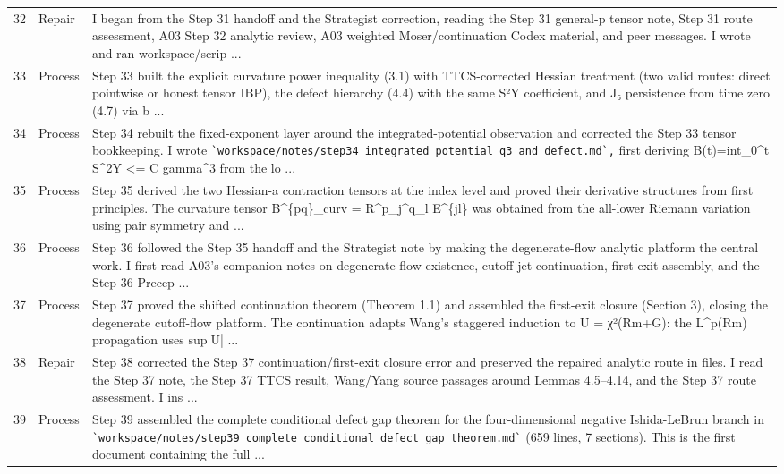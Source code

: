 \documentclass[UTF8,fontset=fandol,zihao=-4]{ctexart}
\begin{document}
\begin{longtable}{r p{} >{\raggedright\arraybackslash}p{}}
32 & Repair & I began from the Step 31 handoff and the Strategist correction, reading the Step 31 general-p tensor note, Step 31 route assessment, A03 Step 32 analytic review, A03 weighted Moser/continuation Codex material, and peer messages. I wrote and ran workspace/scrip ...\\
33 & Process & Step 33 built the explicit curvature power inequality (3.1) with TTCS-corrected Hessian treatment (two valid routes: direct pointwise or honest tensor IBP), the defect hierarchy (4.4) with the same S²Y coefficient, and J₆ persistence from time zero (4.7) via b ...\\
34 & Process & Step 34 rebuilt the fixed-exponent layer around the integrated-potential observation and corrected the Step 33 tensor bookkeeping. I wrote \nolinkurl{`workspace/notes/step34_integrated_potential_q3_and_defect.md`,} first deriving B(t)=int\_0\textasciicircum{}t S\textasciicircum{}2Y <= C gamma\textasciicircum{}3 from the lo ...\\
35 & Process & Step 35 derived the two Hessian-a contraction tensors at the index level and proved their derivative structures from first principles. The curvature tensor B\textasciicircum{}\{pq\}\_curv = R\textasciicircum{}p\_j\textasciicircum{}q\_l E\textasciicircum{}\{jl\} was obtained from the all-lower Riemann variation using pair symmetry and ...\\
36 & Process & Step 36 followed the Step 35 handoff and the Strategist note by making the degenerate-flow analytic platform the central work. I first read A03's companion notes on degenerate-flow existence, cutoff-jet continuation, first-exit assembly, and the Step 36 Precep ...\\
37 & Process & Step 37 proved the shifted continuation theorem (Theorem 1.1) and assembled the first-exit closure (Section 3), closing the degenerate cutoff-flow platform. The continuation adapts Wang's staggered induction to U = χ²(Rm+G): the L\textasciicircum{}p(Rm) propagation uses sup|U| ...\\
38 & Repair & Step 38 corrected the Step 37 continuation/first-exit closure error and preserved the repaired analytic route in files. I read the Step 37 note, the Step 37 TTCS result, Wang/Yang source passages around Lemmas 4.5--4.14, and the Step 37 route assessment. I ins ...\\
39 & Process & Step 39 assembled the complete conditional defect gap theorem for the four-dimensional negative Ishida-LeBrun branch in \nolinkurl{`workspace/notes/step39_complete_conditional_defect_gap_theorem.md`} (659 lines, 7 sections). This is the first document containing the full  ...\\

\end{longtable}
\end{document}
